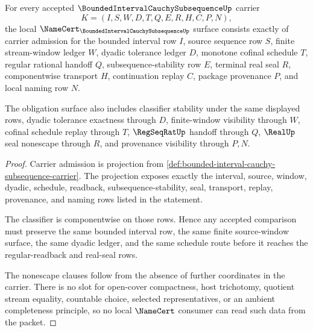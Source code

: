 \begin{theorem}
\label{thm:bounded-interval-cauchy-subsequence-namecert-obligations}
For every accepted $\BoundedIntervalCauchySubsequenceUp$ carrier
$$
K=(I,S,W,D,T,Q,E,R,H,C,P,N),
$$
the local $\NameCert_{\BoundedIntervalCauchySubsequenceUp}$ surface consists exactly of carrier admission for the bounded interval row $I$, source sequence row $S$, finite stream-window ledger $W$, dyadic tolerance ledger $D$, monotone cofinal schedule $T$, regular rational handoff $Q$, subsequence-stability row $E$, terminal real seal $R$, componentwise transport $H$, continuation replay $C$, package provenance $P$, and local naming row $N$.

The obligation surface also includes classifier stability under the same displayed rows, dyadic tolerance exactness through $D$, finite-window visibility through $W$, cofinal schedule replay through $T$, $\RegSeqRatUp$ handoff through $Q$, $\RealUp$ seal nonescape through $R$, and provenance visibility through $P,N$.
\end{theorem}
\begin{proof}
Carrier admission is projection from \autoref{def:bounded-interval-cauchy-subsequence-carrier}. The projection exposes exactly the interval, source, window, dyadic, schedule, readback, subsequence-stability, seal, transport, replay, provenance, and naming rows listed in the statement.

The classifier is componentwise on those rows. Hence any accepted comparison must preserve the same bounded interval row, the same finite source-window surface, the same dyadic ledger, and the same schedule route before it reaches the regular-readback and real-seal rows.

The nonescape clauses follow from the absence of further coordinates in the carrier. There is no slot for open-cover compactness, host trichotomy, quotient stream equality, countable choice, selected representatives, or an ambient completeness principle, so no local $\NameCert$ consumer can read such data from the packet.
\end{proof}

